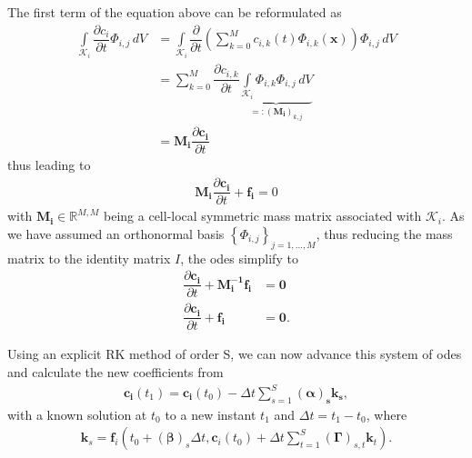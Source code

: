 	The first term of the equation above can be reformulated as 
	\begin{align*}
		\int\limits_{\mathcal{K}_i} \dfrac{\partial c_i}{\partial t}\Phi_{i,j} \, dV &= \int\limits_{\mathcal{K}_i} \dfrac{\partial}{\partial t} \left(\sum\limits_{k=0}^{M}c_{i,k}(t)\Phi_{i,k}(\mathbf{x})\right)\Phi_{i,j} \, dV \\
		&= \sum\limits_{k=0}^{M}\dfrac{\partial c_{i,k}}{\partial t}\underbrace{\int\limits_{\mathcal{K}_i}\Phi_{i,k}\Phi_{i,j}\, dV}_{=: (\mathbf{M_i})_{k,j}} \\
		&= \mathbf{M_i} \dfrac{\partial \mathbf{c_i}}{\partial t}
	\end{align*}
	thus leading to 
	\begin{align}
		\mathbf{M_i} \dfrac{\partial \mathbf{c_i}}{\partial t} + \mathbf{f_i} = 0
	\end{align}
	with $\mathbf{M_i}\in \mathbb{R}^{M,M}$ being a cell-local symmetric mass matrix associated with $\mathcal{K}_i$. As we have assumed an orthonormal basis $\left\{\Phi_{i,j}\right\}_{j=1,...,M}$, thus reducing the mass matrix to the identity matrix $I$, the \gls{ode}s simplify to
	\begin{align}
		\dfrac{\partial \mathbf{c_i}}{\partial t} + \mathbf{M_i^{-1}f_i}&=\mathbf{0}\\
		\dfrac{\partial \mathbf{c_i}}{\partial t} + \mathbf{f_i}&=\mathbf{0}.	
	\end{align}
	
	Using an explicit RK method of order S, we can now advance this system of \glspl{ode} and calculate the new coefficients from
	\begin{align}
		\mathbf{c_i}(t_1) = \mathbf{c_i}(t_0)-\Delta t \sum\limits_{s=1}^{S}\mathbf{(\alpha)_s k_s}, 
	\end{align}
	with a known solution at $t_0$ to a new instant $t_1$ and $\Delta t = t_1 - t_0$, where
	\begin{align}
		\mathbf{k}_s = \mathbf{f}_i \left( t_0 +(\mathbf{\beta})_s \Delta t, \mathbf{c}_i (t_0) + \Delta t \sum\limits_{t = 1}^{S}\boldsymbol{(\Gamma)}_{s,t}\mathbf{k}_t\right).
	\end{align}
	
